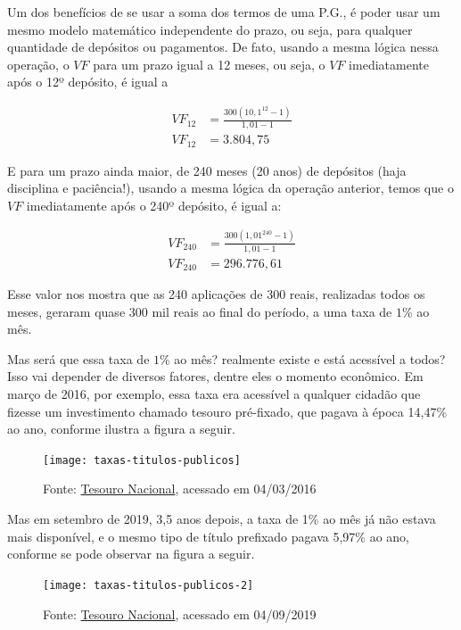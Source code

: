Um dos benefícios de se usar a soma dos termos de uma P.G., é poder usar um mesmo modelo matemático independente do prazo, ou seja, para qualquer quantidade de depósitos ou pagamentos. De fato, usando a mesma lógica nessa operação, o $\mathit{VF}$ para um prazo igual a 12 meses, ou seja, o $\mathit{VF}$ imediatamente após o 12º depósito, é igual a

\begin{align*}
\mathit{VF}_{12}&=\frac{300(10{,}1^{12}-1)}{1{,}01-1}\\
\mathit{VF}_{12}&=3.804{,}75
\end{align*}

E para um prazo ainda maior, de 240 meses (20 anos) de depósitos (haja disciplina e paciência!), usando a mesma lógica da operação anterior, temos que o $\mathit{VF}$ imediatamente após o 240º depósito, é igual a:

\begin{align*}
\mathit{VF}_{240}&=\frac{300(1{,}01^{240}-1)}{1,01-1}\\
\mathit{VF}_{240}&=296.776{,}61
\end{align*}

Esse valor nos mostra que as 240 aplicações de 300 reais, realizadas todos os meses, geraram quase 300 mil reais ao final do período, a uma taxa de $1$\% ao mês. 


Mas será que essa taxa de $1\%$ ao mês? realmente existe e está acessível a todos? Isso vai depender de diversos fatores, dentre eles o momento econômico. Em março de 2016, por exemplo, essa taxa era acessível a qualquer cidadão que fizesse um investimento chamado tesouro pré-fixado, que pagava à época 14,47\% ao ano, conforme ilustra a figura a seguir.

\begin{figure}[H]

\centering
\texttt{[image: taxas-titulos-publicos]}
\caption{Fonte: \href{http://www.tesouro.fazenda.gov.br/tesouro-direto-precos-e-taxas-dos-titulos}{Tesouro Nacional}, acessado em 04/03/2016}

\end{figure}

Mas em setembro de 2019, 3,5 anos depois, a taxa de 1\% ao mês já não estava mais disponível, e o mesmo tipo de título prefixado pagava 5,97\% ao ano, conforme se pode observar na figura a seguir.

\begin{figure}[H]

\centering
\texttt{[image: taxas-titulos-publicos-2]}
\caption{Fonte: \href{http://www.tesouro.fazenda.gov.br/tesouro-direto-precos-e-taxas-dos-titulos}{Tesouro Nacional}, acessado em 04/09/2019}

\end{figure}

